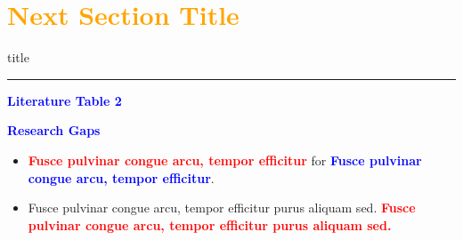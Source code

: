 \documentclass[aspectratio=169]{beamer}
\begin{document}
  
\section*{\textbf{\textcolor{orange}{Next Section Title}}}
    \begin{frame}[plain]
        \vfill
      \centering
      \begin{beamercolorbox}[sep=8pt,center,shadow=true,rounded=true]{title}
        \insertsectionhead\par%
        \color{oxfordblue}\noindent\rule{10cm}{1pt}
      \end{beamercolorbox}
      \vfill
  \end{frame}
  
\begin{frame}{\normalsize \textcolor{blue}{\textbf{Literature Table 2}}}
\vspace{-1.9cm}

\end{frame}


\begin{frame}{\textcolor{blue}{\textbf{Research Gaps}}}
    \begin{itemize}        
        \item \textcolor{red}{\textbf{Fusce pulvinar congue arcu, tempor efficitur}} for \textcolor{blue}{\textbf{Fusce pulvinar congue arcu, tempor efficitur}}.
        
        \item Fusce pulvinar congue arcu, tempor efficitur purus aliquam sed. \textcolor{red}{\textbf{Fusce pulvinar congue arcu, tempor efficitur purus aliquam sed.}}
    \end{itemize}
\end{frame}



\end{document}
